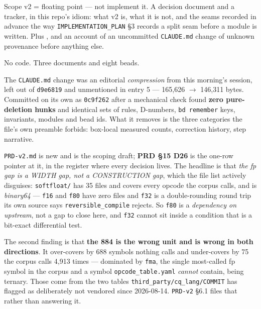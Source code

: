 
Scope v2 = floating point --- not implement it. A decision document and a tracker, in this
repo's idiom: what v2 is, what it is not, and the seams recorded in advance the way
\texttt{IMPLEMENTATION\_PLAN} \S3 records a split seam before a module is written. Plus
, and an account of an uncommitted \texttt{CLAUDE.md} change of unknown provenance
before anything else.

No code. Three documents and eight beads.

The \texttt{CLAUDE.md} change was an editorial \emph{compression} from this morning's session,
left out of \texttt{d9e6819} and unmentioned in entry 5 --- 165{,}626 $\to$ 146{,}311 bytes.
Committed on its own as \texttt{0c9f262} after a mechanical check found \textbf{zero
pure-deletion hunks} and identical sets of rules, D-numbers, \texttt{bd remember} keys,
invariants, modules and bead ids. What it removes is the three categories the file's own
preamble forbids: box-local measured counts, correction history, step narrative.

\texttt{PRD-v2.md} is new and is the scoping draft; \textbf{PRD \S15 D26} is the one-row
pointer at it, in the register where every decision lives. The headline is that
\emph{the fp gap is a WIDTH gap, not a CONSTRUCTION gap}, which the file list actively
disguises: \texttt{softfloat/} has 35 files and covers every opcode the corpus calls, and is
\emph{binary64} --- \texttt{f16} and \texttt{f80} have zero files and \texttt{f32} is a
double-rounding round trip its own source says \texttt{reversible\_compile} rejects. So
\texttt{f80} is a \emph{dependency on upstream}, not a gap to close here, and \texttt{f32}
cannot sit inside a condition that is a bit-exact differential test.

The second finding is that \textbf{the 884 is the wrong unit and is wrong in both directions}.
It over-covers by 688 symbols nothing calls and under-covers by 75 the corpus calls 4{,}913
times --- dominated by \texttt{fma}, the single most-called fp symbol in the corpus and a
symbol \texttt{opcode\_table.yaml} \emph{cannot} contain, being ternary. Those come from the
two tables \texttt{third\_party/cq\_lang/COMMIT} has flagged as deliberately not vendored since
2026-08-14. \texttt{PRD-v2} \S6.1 files that rather than answering it.

